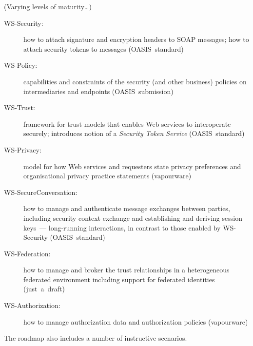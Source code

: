 \documentclass{sepslide-soa-faked} %
\begin{document}
\begin{slide}
(Varying levels of maturity\ldots)
	\begin{description} 

	\item[WS-Security:] how to attach signature and encryption
	headers to SOAP messages; how to attach security tokens
	to messages 
(OASIS~standard)

	\item[WS-Policy:] capabilities and constraints of the security
	(and other business) policies on intermediaries and endpoints
(OASIS~submission)

	\item[WS-Trust:] framework for trust models that enables Web
	services to interoperate securely; introduces notion of a
	\emph{Security Token Service}
(OASIS~standard)

	\item[WS-Privacy:] model for how Web services and requesters
	state privacy preferences and organisational privacy practice
	statements
(vapourware)
	\end{description}
\end{slide}
\begin{slide}
	\begin{description}

	\item[WS-SecureConversation:] how to manage and authenticate
	message exchanges between parties, including security context
	exchange and establishing and deriving session keys~---
	long-running interactions, in contrast to those enabled by
	WS-Security 
(OASIS~standard)

	\item[WS-Federation:]
	how to manage and broker the trust relationships in a
	heterogeneous federated environment including support for
	federated identities
(just~a~draft)

	\item[WS-Authorization:] how to manage authorization data and
	authorization policies
(vapourware)

	\end{description}
	The roadmap also includes a number of instructive scenarios.
\end{slide}
\end{document}
